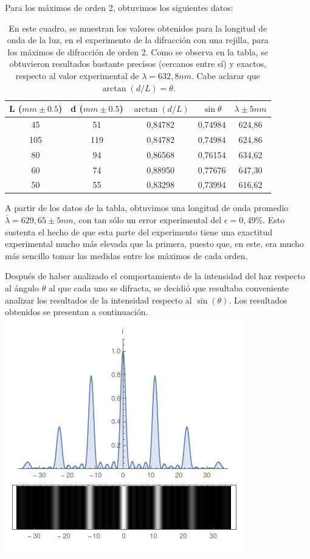 \documentclass[%
 reprint,
 amsmath,amssymb,
 aps,
]{revtex4-1}
\begin{document}
Para los máximos de orden 2, obtuvimos los siguientes datos:
\begin{table}[H]
\begin{tabular}{|c|c|c|c|c|}
\label{tabla2s}
\hline
L ($mm \pm 0.5$) & d ($mm \pm 0.5$)    & $\arctan(d/L)$      & $\sin{\theta}$        & $\lambda \pm 5 nm$      \\ \hline
45  & 51      & 0,84782 & 0,74984 & 624,86 \\ \hline
105 & 119     & 0,84782 & 0,74984 & 624,86 \\ \hline
80  & 94      & 0,86568 & 0,76154  & 634,62 \\ \hline
60  & 74      & 0,88950 & 0,77676 & 647,30 \\ \hline
50  & 55      & 0,83298 & 0,73994 & 616,62 \\ \hline
\end{tabular} \caption{En este cuadro, se muestran los valores obtenidos para la longitud de onda de la luz, en el experimento de la difracción con una rejilla, para los máximos de difracción de orden 2. Como se observa en la tabla, se obtuvieron resultados bastante precisos (cercanos entre sí) y exactos, respecto al valor experimental de $\lambda = 632,8 nm$. Cabe aclarar que $\arctan(d/L) = \theta$.}
\end{table}

A partir de los datos de la tabla, obtuvimos una longitud de onda promedio $\overline{\lambda} = 629,65  \pm 5 nm$, con tan sólo un error experimental del $\epsilon = 0,49\%$. Esto sustenta el hecho de que esta parte del experimento tiene una exactitud experimental mucho más elevada que la primera, puesto que, en este, era mucho más sencillo tomar las medidas entre los máximos de cada orden. 

Después de haber analizado el comportamiento de la intensidad del haz respecto al ángulo $\theta$ al que cada uno se difracta, se decidió que resultaba conveniente analizar los resultados de la intensidad respecto al $\sin{(\theta)}$. Los resultados obtenidos se presentan a continuación. \\    
\includegraphics[scale= 0.5]{5.png}
\end{document}
